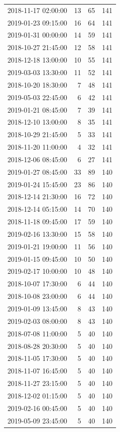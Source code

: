 \begin{tabular}{lrrr}
2018-11-17 02:00:00 & 13 & 65 & 141 \\
2019-01-23 09:15:00 & 16 & 64 & 141 \\
2019-01-31 00:00:00 & 14 & 59 & 141 \\
2018-10-27 21:45:00 & 12 & 58 & 141 \\
2018-12-18 13:00:00 & 10 & 55 & 141 \\
2019-03-03 13:30:00 & 11 & 52 & 141 \\
2018-10-20 18:30:00 & 7 & 48 & 141 \\
2019-05-03 22:45:00 & 6 & 42 & 141 \\
2019-01-21 08:45:00 & 7 & 39 & 141 \\
2018-12-10 13:00:00 & 8 & 35 & 141 \\
2018-10-29 21:45:00 & 5 & 33 & 141 \\
2018-11-20 11:00:00 & 4 & 32 & 141 \\
2018-12-06 08:45:00 & 6 & 27 & 141 \\
2019-01-27 08:45:00 & 33 & 89 & 140 \\
2019-01-24 15:45:00 & 23 & 86 & 140 \\
2018-12-14 21:30:00 & 16 & 72 & 140 \\
2018-12-14 05:15:00 & 14 & 70 & 140 \\
2018-11-18 09:45:00 & 17 & 59 & 140 \\
2019-02-16 13:30:00 & 15 & 58 & 140 \\
2019-01-21 19:00:00 & 11 & 56 & 140 \\
2019-01-15 09:45:00 & 10 & 50 & 140 \\
2019-02-17 10:00:00 & 10 & 48 & 140 \\
2018-10-07 17:30:00 & 6 & 44 & 140 \\
2018-10-08 23:00:00 & 6 & 44 & 140 \\
2019-01-09 13:45:00 & 8 & 43 & 140 \\
2019-02-03 08:00:00 & 8 & 43 & 140 \\
2018-07-08 11:00:00 & 5 & 40 & 140 \\
2018-08-28 20:30:00 & 5 & 40 & 140 \\
2018-11-05 17:30:00 & 5 & 40 & 140 \\
2018-11-07 16:45:00 & 5 & 40 & 140 \\
2018-11-27 23:15:00 & 5 & 40 & 140 \\
2018-12-02 01:15:00 & 5 & 40 & 140 \\
2019-02-16 00:45:00 & 5 & 40 & 140 \\
2019-05-09 23:45:00 & 5 & 40 & 140 \\

\end{tabular}
